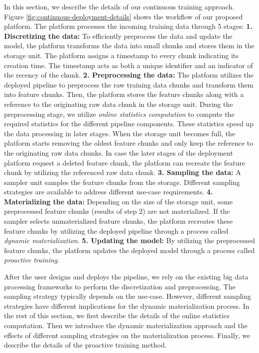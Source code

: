 In this section, we describe the details of our continuous training approach.
Figure \ref{fig:continuous-deployment-details} shows the workflow of our proposed platform.
The platform processes the incoming training data through 5 stages:\newline
\textbf{1. Discretizing the data: } 
To efficiently preprocess the data and update the model, the platform transforms the data into small chunks and stores them in the storage unit. 
The platform assigns a timestamp to every chunk indicating its creation time.
The timestamp acts as both a unique identifier and an indicator of the recency of the chunk.\newline
\textbf{2. Preprocessing the data: } 
The platform utilizes the deployed pipeline to preprocess the raw training data chunks and transform them into feature chunks.
Then, the platform stores the feature chunks along with a reference to the originating raw data chunk in the storage unit.
During the preprocessing stage, we utilize \textit{online statistics computation} to compute the required statistics for the different pipeline components.
These statistics speed up the data processing in later stages.
When the storage unit becomes full, the platform starts removing the oldest feature chunks and only keep the reference to the originating raw data chunks.
In case the later stages of the deployment platform request a deleted feature chunk, the platform can recreate the feature chunk by utilizing the referenced raw data chunk. \newline
\textbf{3. Sampling the data: }
A sampler unit samples the feature chunks from the storage.
Different sampling strategies are available to address different use-case requirements.\newline
\textbf{4. Materializing the data: }
Depending on the size of the storage unit, some preprocessed feature chunks (results of step 2) are not materialized.
If the sampler selects unmaterialized feature chunks, the platform recreates these feature chunks by utilizing the deployed pipeline through a process called \textit{dynamic materialization}.\newline
\textbf{5. Updating the model: }
By utilizing the preprocessed feature chunks, the platform updates the deployed model through a process called \textit{proactive training}.\newline

After the user designs and deploys the pipeline, we rely on the existing big data processing frameworks to perform the discretization and preprocessing.
The sampling strategy typically depends on the use-case.
However, different sampling strategies have different implications for the dynamic materialization process.
In the rest of this section, we first describe the details of the online statistics computation.
Then we introduce the dynamic materialization approach and the effects of different sampling strategies on the materialization process.
Finally, we describe the details of the proactive training method.

